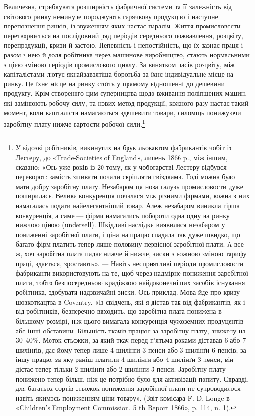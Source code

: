 Величезна, стрибкувата розширність фабричної системи та
її залежність від світового ринку неминуче породжують гарячкову
продукцію і наступне переповнення ринків, із звуженням
яких настає параліч. Життя промисловости перетворюється на
послідовний ряд періодів середнього пожвавлення, розцвіту,
перепродукції, кризи й застою. Непевність і непостійність, що
їх зазнає праця і разом з нею й доля робітника через машинове
виробництво, стають нормальними з цією зміною періодів промислового
циклу. За винятком часів розцвіту, між капіталістами лютує
якнайзавзятіша боротьба за їхнє індивідуальне місце на ринку.
Це їхнє місце на ринку стоїть у прямому відношенні до дешевини
продукту. Крім створеного цим суперництва щодо вживання
поліпшених машин, які замінюють робочу силу, та нових метод
продукції, кожного разу настає такий момент, коли капіталісти
намагаються здешевити товари, силоміць понижуючи заробітну
плату нижче вартости робочої сили.\footnote{
У відозві робітників, викинутих на брук льокавтом фабрикантів
чобіт із Лестеру, до «Trade-Societies of England», липень 1866 p., між
іншим, сказано: «Ось уже років із 20 тому, як у чоботарстві Лестеру
відбувся переворот: замість зшивати почали скріпляти гвіздками. Тоді
можна було мати добру заробітну плату. Незабаром ця нова галузь промисловости
дуже поширилась. Велика конкуренція почалася між різними
фірмами, кожна з них намагалась подати найелегантніший товар. Алеж
незабаром виникла гірша конкуренція, а саме — фірми намагались побороти
одна одну на ринку нижчою ціною (undersell). Шкідливі наслідки виявилися
незабаром у пониженні заробітної плати, і ціна на працю спадала
так дуже швидко, що багато фірм платить тепер лише половину первісної
заробітної плати. А все ж, хоч заробітна плата падає нижче й нижче,
зиски з кожною зміною тарифу праці, здається, зростають». — Навіть
несприятливі періоди промисловости фабриканти використовують на те,
щоб через надмірне пониження заробітної плати, тобто безпосередньою
крадіжкою найдоконечніших засобів існування робітника, здобувати
надзвичайні зиски. Ось приклад. Мова йде про кризу шовкоткацтва в
Coventry. «Із свідчень, які я дістав так від фабрикантів, як і від робітників,
безперечно виходить, що заробітна плата понижена в більшому розмірі,
ніж цього вимагала конкуренція чужоземних продуцентів або інші обставини.
Більшість ткачів працює за заробітну плату, знижену на 30--40\%.
Моток стьожки, за який ткач перед п’ятьма роками діставав 6 або 7 шилінґів,
дає йому тепер лише 4 шилінґи 3 пенси або 3 шилінґи 6 пенсів;
за іншу працю, за яку раніш платили 4 шилінґи або 4 шилінґи 3 пенси,
він дістає тепер тільки 2 шилінґи або 2 шилінґи 3 пенси. Заробітну плату
понижено тепер більш, ніж це потрібно було для активізації попиту.
Справді, для багатьох сортів стьожок пониження заробітної плати не
супроводилося навіть якимось пониженням ціни товару». (Звіт комісара
F. D. Longe в «Children’s Employment Commission. 5 th Report 1866»,
p. 114, n. 1).
}


